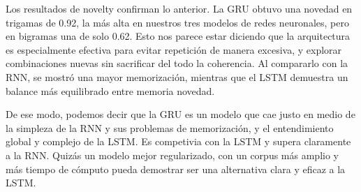 Los resultados de novelty confirman lo anterior. La GRU obtuvo una novedad en trigamas de 0.92,
la más alta en nuestros tres modelos de redes neuronales, pero en bigramas una de solo 0.62. Esto
nos parece estar diciendo que la arquitectura es especialmente efectiva para evitar repetición 
de manera excesiva, y explorar combinaciones nuevas sin sacrificar del todo la coherencia. Al 
compararlo con la RNN, se mostró una mayor memorización, mientras que el LSTM demuestra un balance
más equilibrado entre memoria novedad. 

De ese modo, podemos decir que la GRU es un modelo que cae justo en medio de la simpleza de la
RNN y sus problemas de memorización, y el entendimiento global y complejo de la LSTM. Es competivia
con la LSTM y supera claramente a la RNN. Quizás un modelo mejor regularizado, con un corpus 
más amplio y más tiempo de cómputo pueda demostrar ser una alternativa clara y eficaz a la LSTM.



\clearpage